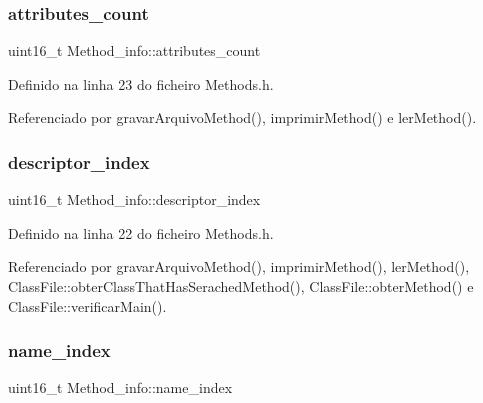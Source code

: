 \mbox{\label{structMethod__info_afd638bcc6f20cfa8dd1de8741c8b5493}} 
\subsubsection{\texorpdfstring{attributes\+\_\+count}{attributes\_count}}
{\footnotesize\ttfamily uint16\+\_\+t Method\+\_\+info\+::attributes\+\_\+count}



Definido na linha 23 do ficheiro Methods.\+h.



Referenciado por gravar\+Arquivo\+Method(), imprimir\+Method() e ler\+Method().

\mbox{\label{structMethod__info_af713175c97f681296e801e0c11e0ae34}} 
\subsubsection{\texorpdfstring{descriptor\+\_\+index}{descriptor\_index}}
{\footnotesize\ttfamily uint16\+\_\+t Method\+\_\+info\+::descriptor\+\_\+index}



Definido na linha 22 do ficheiro Methods.\+h.



Referenciado por gravar\+Arquivo\+Method(), imprimir\+Method(), ler\+Method(), Class\+File\+::obter\+Class\+That\+Has\+Serached\+Method(), Class\+File\+::obter\+Method() e Class\+File\+::verificar\+Main().

\mbox{\label{structMethod__info_ad1f067bfd8d2d231f598824676dc7851}} 
\subsubsection{\texorpdfstring{name\+\_\+index}{name\_index}}
{\footnotesize\ttfamily uint16\+\_\+t Method\+\_\+info\+::name\+\_\+index}



